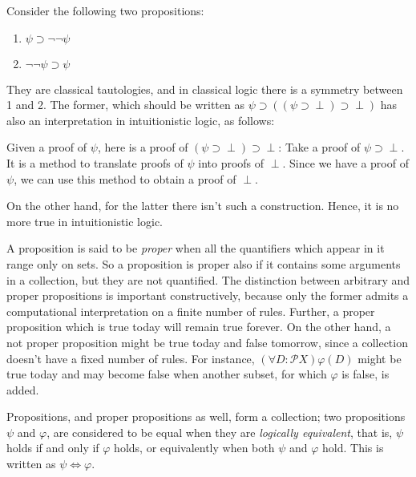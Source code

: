 \begin{example}
  Consider the following two propositions:
  \begin{enumerate}
  \item $\psi\supset\neg\neg\psi$
  \item $\neg\neg\psi\supset\psi$
  \end{enumerate}
  They are classical tautologies, and in classical logic there is a symmetry
  between 1 and 2. The former, which should be written as
  $\psi\supset((\psi\supset\perp)\supset\perp)$ has also an interpretation in
  intuitionistic logic, as follows:
  \begin{center}
    Given a proof of $\psi$, here is a proof of
    $(\psi\supset\perp)\supset\perp$: Take a proof of $\psi\supset\perp$. It is
    a method to translate proofs of $\psi$ into proofs of $\perp$. Since we have
    a proof of $\psi$, we can use this method to obtain a proof of $\perp$.
  \end{center}
  On the other hand, for the latter there isn't such a construction. Hence, it
  is no more true in intuitionistic logic.
\end{example}

A proposition is said to be \textit{proper} when all the quantifiers which
appear in it range only on sets. So a proposition is proper also if it contains
some arguments in a collection, but they are not quantified. The distinction
between arbitrary and proper propositions is important constructively, because
only the former admits a computational interpretation on a finite number of
rules. Further, a proper proposition which is true today will remain true
forever. On the other hand, a not proper proposition might be true today and
false tomorrow, since a collection doesn't have a fixed number of rules. For
instance, $(\forall D : \mathcal{P}X)\varphi(D)$ might be true today and may become
false when another subset, for which $\varphi$ is false, is added.

Propositions, and proper propositions as well, form a collection; two
propositions $\psi$ and $\varphi$, are considered to be equal when they are
\textit{logically equivalent}, that is, $\psi$ holds if and only if $\varphi$
holds, or equivalently when both $\psi$ and $\varphi$ hold. This is written as
$\psi \iff \varphi$.


